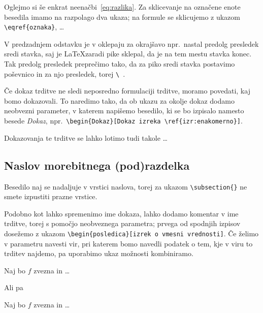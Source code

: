 \documentclass[mat1, tisk]{fmfdelo}
\begin{document}
Oglejmo si še enkrat neenačbi~\eqref{eq:razlika}. Za sklicevanje na označene
enote besedila imamo na razpolago dva ukaza; na formule se sklicujemo z ukazom
\verb|\eqref{oznaka}|, \dots

V predzadnjem odstavku je v oklepaju za okrajšavo npr.\ nastal predolg
presledek sredi stavka, saj je \LaTeX zaradi pike sklepal, da je na tem mestu
stavka konec. Tak predolg presledek preprečimo tako, da za piko sredi stavka
postavimo poševnico in za njo presledek, torej \verb|\ |.

Če dokaz trditve ne sledi neposredno formulaciji trditve, moramo povedati, kaj
bomo dokazovali. To naredimo tako, da ob ukazu za okolje dokaz dodamo neobvezni
parameter,  v katerem napišemo besedilo, ki se bo izpisalo namesto besede
\emph{Dokaz}, npr.\ \verb|\begin{Dokaz}[Dokaz izreka \ref{izr:enakomerno}]|.

\begin{dokaz}
  Dokazovanja te trditve se lahko lotimo tudi takole \ldots
\end{dokaz}

\subsection{Naslov morebitnega (pod)razdelka} Besedilo naj se nadaljuje v vrstici naslova, torej za ukazom \verb|\subsection{}| ne smete izpustiti prazne vrstice.

Podobno kot lahko spremenimo ime dokaza, lahko dodamo komentar v ime trditve,
torej s pomočjo neobveznega parametra; prvega od spodnjih izpisov dosežemo z
ukazom \verb|\begin{posledica}[izrek o vmesni vrednosti]|. Če želimo v
parametru navesti vir, pri katerem bomo navedli podatek o tem, kje v viru to
trditev najdemo, pa uporabimo ukaz
možnosti kombiniramo.


\begin{posledica}
  Naj bo $f$ zvezna in \ldots
\end{posledica}

Ali pa

\begin{posledica}%
  Naj bo $f$ zvezna in \ldots
\end{posledica}
\end{document}
